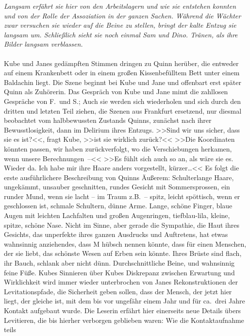 \emph{Langsam erfährt sie hier von den Arbeitslagern und wie sie entstehen konnten und
von der Rolle der Assoziation in der ganzen Sachen. 
Während die Wächter zwar versuchen sie wieder auf die Beine zu stellen, bringt
der kalte Entzug sie langsam um. 
Schließlich sieht sie noch einmal Sam und Dino. 
Tränen, als ihre Bilder langsam verblassen.}\\\\
%
Kube und Janes gedämpften Stimmen dringen zu Quinn herüber, die
entweder auf einem Krankenbett oder in einem großen Kissenbefülltem Bett unter
einem Baldachin liegt.
Die Szene beginnt bei Kube und Jane und offenbart erst später Quinn als
Zuhörerin. 
Das Gespräch von Kube und Jane mimt die zahllosen Gespräche von F.~und S.;
Auch sie werden sich wiederholen und sich durch den dritten und letzten Teil
ziehen, die Szenen aus Frankfurt ersetzend, nur diesmal beobachtet vom
halbbewussten Zustands Quinns, zunächst nach ihrer Bewusstlosigkeit, dann im
Delirium ihres Entzugs.
>>Sind wir uns sicher, dass sie es ist?<<, fragt Kube, >>ist sie wirklich
zurück?<< 
>>Die Koordinaten könnten passen, wir haben zurückverfolgt, wo die
Verschiebungen herkamen, wenn unsere Berechnungen~--<< 
>>Es fühlt sich auch so an, als wäre sie es. Wieder da. Ich habe mir ihre Haare
anders vorgestellt, kürzer\dots{}<< 
Es folgt die erste ausführlichere Beschreibung von Quinns Äußerem: 
Schulterlange Haare, ungekämmt, unsauber geschnitten, rundes Gesicht mit
Sommersprossen, ein runder Mund, wenn sie lacht -- im Traum z.B.~-- spitz, leicht
spöttisch, wenn er geschlossen ist, schmale Schultern, dünne Arme. 
Lange, schöne Finger, blaue Augen mit leichten Lachfalten und großen
Augenringen, tiefblau-lila, kleine, spitze, schöne Nase. 
Nicht im  Sinne, aber gerade die Sympathie, die Haut ihres
Gesichts, das unperfekte ihres ganzen Ausdrucks und Auftretens, hat etwas
wahnsinnig anziehendes, dass M hübsch nennen könnte, dass für einen Menschen,
der sie liebt, das schönste Wesen auf Erben sein könnte. 
Ihres Brüste sind flach, ihr Bauch, schlank aber nicht dünn. 
Durchschnittliche Beine, und wahnsinnig feine Füße. 
Kubes Sinnieren über Kubes Diskrepanz zwischen Erwartung und Wirklichkeit wird
immer wieder unterbrochen von Janes Rekonstruktionen der Levitationspfade, die
Sicherheit geben sollen, dass der Mensch, der jetzt hier liegt, der gleiche ist,
mit dem bis vor ungefähr einem Jahr und für ca.~drei Jahre Kontakt aufgebaut
wurde.
Die Leserin erfährt hier einerseits neue Details übers Levitieren, die bis
hierher verborgen geblieben waren: Wie die Kontaktaufnahme teils 
